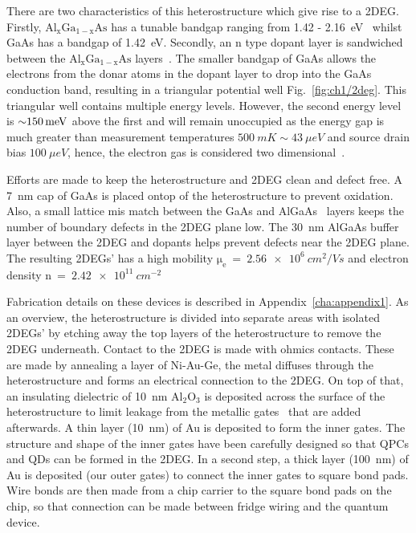 There are two characteristics of this heterostructure which give rise to a 2DEG. Firstly, $\mathrm{Al_xGa_{1-x}As}$ has a tunable bandgap ranging from 1.42 - \qty{2.16}{eV}~\cite{gaas_overview} whilst GaAs has a bandgap of \qty{1.42}{eV}. Secondly, an n type dopant layer is sandwiched between the $\mathrm{Al_xGa_{1-x}As}$ layers~\cite{dopant_layer}. The smaller bandgap of GaAs allows the electrons from the donar atoms in the dopant layer to drop into the GaAs conduction band, resulting in a triangular potential well Fig.~\ref{fig:ch1/2deg}. This triangular well contains multiple energy levels. However, the second energy level is $\qty{\sim 150}{meV}$ above the first and will remain unoccupied as the energy gap is much greater than measurement temperatures $\qty{500}{mK}\sim\qty{43}{\mu eV}$ and source drain bias $\qty{100}{\mu eV}$, hence, the electron gas is considered two dimensional~\cite{BEENAKKER_1991}.

Efforts are made to keep the heterostructure and 2DEG clean and defect free. A \qty{7}{nm} cap of GaAs is placed ontop of the heterostructure to prevent oxidation. Also, a small lattice mis match between the GaAs and AlGaAs~\cite{gaas_superlattice} layers keeps the number of boundary defects in the 2DEG plane low. The \qty{30}{nm} AlGaAs buffer layer between the 2DEG and dopants helps prevent defects near the 2DEG plane. The resulting 2DEGs' has a high mobility $\mathrm{\mu_e}~=~\qty{2.56e6}{cm^2/Vs}$ and electron density $\mathrm{n}~=~\qty{2.42e11}{cm^{-2}}$

Fabrication details on these devices is described in Appendix~\ref{cha:appendix1}. As an overview, the heterostructure is divided into separate areas with isolated 2DEGs' by etching away the top layers of the heterostructure to remove the 2DEG underneath. Contact to the 2DEG is made with ohmics contacts. These are made by annealing a layer of Ni-Au-Ge, the metal diffuses through the heterostructure and forms an electrical connection to the 2DEG. On top of that, an insulating dielectric of \qty{10}{nm} $\mathrm{Al_2O_3}$ is deposited across the surface of the heterostructure to limit leakage from the metallic gates~\cite{insulating_gates} that are added afterwards. A thin layer (\qty{10}{nm}) of Au is deposited to form the inner gates. The structure and shape of the inner gates have been carefully designed so that QPCs and QDs can be formed in the 2DEG. In a second step, a thick layer (\qty{100}{nm}) of Au is deposited (our outer gates) to connect the inner gates to square bond pads. Wire bonds are then made from a chip carrier to the square bond pads on the chip, so that connection can be made between fridge wiring and the quantum device. 




